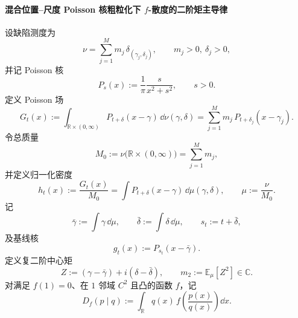 \paragraph{混合位置--尺度 Poisson 核粗粒化下 \texorpdfstring{$f$}{f}-散度的二阶矩主导律}
设缺陷测度为
\[
\nu=\sum_{j=1}^{M}m_j\,\delta_{(\gamma_j,\delta_j)},
\qquad
m_j>0,\ \delta_j>0,
\]
并记 Poisson 核
\[
P_s(x):=\frac{1}{\pi}\frac{s}{x^2+s^2},
\qquad s>0.
\]
定义 Poisson 场
\[
G_t(x):=\int_{\mathbb R\times(0,\infty)}P_{t+\delta}(x-\gamma)\,\dd\nu(\gamma,\delta)
=\sum_{j=1}^{M}m_j\,P_{t+\delta_j}(x-\gamma_j).
\]
令总质量
\[
M_0:=\nu\bigl(\mathbb R\times(0,\infty)\bigr)=\sum_{j=1}^{M}m_j,
\]
并定义归一化密度
\[
h_t(x):=\frac{G_t(x)}{M_0}
=\int P_{t+\delta}(x-\gamma)\,\dd\mu(\gamma,\delta),
\qquad
\mu:=\frac{\nu}{M_0}.
\]
记
\[
\bar\gamma:=\int \gamma\,\dd\mu,\qquad
\bar\delta:=\int \delta\,\dd\mu,\qquad
s_t:=t+\bar\delta,
\]
及基线核
\[
g_t(x):=P_{s_t}(x-\bar\gamma).
\]
定义复二阶中心矩
\[
Z:=(\gamma-\bar\gamma)+i(\delta-\bar\delta),
\qquad
m_2:=\mathbb E_\mu[Z^2]\in\mathbb C.
\]
对满足 \(f(1)=0\)、在 \(1\) 邻域 \(C^2\) 且凸的函数 \(f\)，记
\[
D_f(p\mid q):=\int_{\mathbb R}q(x)\,f\!\left(\frac{p(x)}{q(x)}\right)\dd x.
\]

